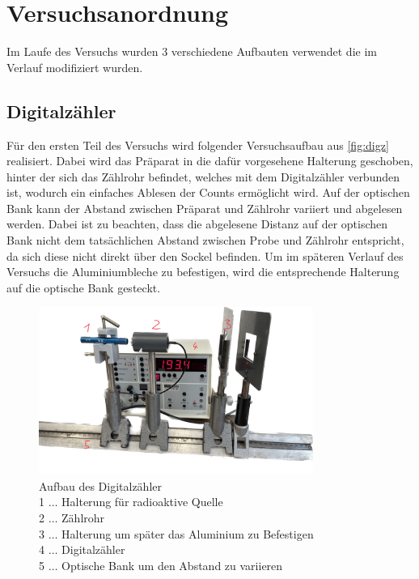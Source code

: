 \documentclass[12pt,english,ngerman]{scrartcl}
\begin{document}
\section{Versuchsanordnung}\label{sec:Versuchsanordnung}

Im Laufe des Versuchs wurden 3 verschiedene Aufbauten verwendet die im Verlauf
modifiziert wurden.

\subsection{Digitalzähler}\label{aufbau_Digz}

Für den ersten Teil des Versuchs wird folgender Versuchsaufbau aus
\autoref{fig:digz} realisiert. Dabei wird das Präparat in die dafür vorgesehene
Halterung geschoben, hinter der sich das Zählrohr befindet, welches mit dem
Digitalzähler verbunden ist, wodurch ein einfaches Ablesen der Counts
ermöglicht wird. Auf der optischen Bank kann der Abstand zwischen Präparat und
Zählrohr variiert und abgelesen werden. Dabei ist zu beachten, dass die
abgelesene Distanz auf der optischen Bank nicht dem tatsächlichen Abstand
zwischen Probe und Zählrohr entspricht, da sich diese nicht direkt über den
Sockel befinden. Um im späteren Verlauf des Versuchs die Aluminiumbleche zu
befestigen, wird die entsprechende Halterung auf die optische Bank gesteckt.

\begin{figure}[H]
	\begin{center}
		\includegraphics[width = 0.8\textwidth]{./figures/digz.png}

	\end{center}
	\caption[Aufbau des Digitalzähler]{
		Aufbau des Digitalzähler                                    \\
		1 \(\dots\) Halterung für radioaktive Quelle                \\
		2 \(\dots\) Zählrohr                                        \\
		3 \(\dots\) Halterung um später das Aluminium zu Befestigen \\
		4 \(\dots\) Digitalzähler                                   \\
		5 \(\dots\) Optische Bank um den Abstand zu variieren
	} \label{fig:digz}

\end{figure}
\end{document}

